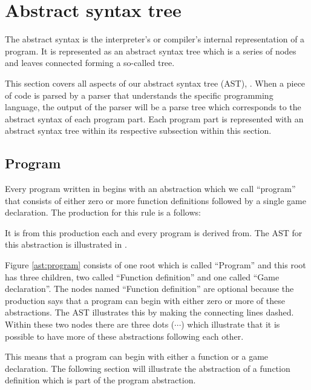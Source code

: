 \section{Abstract syntax tree}

The abstract syntax is the interpreter's or compiler's internal representation of a program. It is represented as an abstract syntax tree which is a series of nodes and leaves connected forming a so-called tree.

This section covers all aspects of our abstract syntax tree (AST), . When a piece of code is parsed by a parser that understands the specific programming language, the output of the parser will be a parse tree which corresponds to the abstract syntax of each program part. Each program part is represented with an abstract syntax tree within its respective subsection within this section.

\subsection{Program}
Every program written in \productname{} begins with an abstraction which we call ``program'' that consists of either zero or more function definitions followed by a single game declaration. The production for this rule is a follows:

\begin{ebnf}
\end{ebnf}

It is from this production each and every program is derived from. The AST for this abstraction is illustrated in .



Figure \ref{ast:program} consists of one root which is called ``Program'' and this root has three children, two called ``Function definition'' and one called ``Game declaration''. The nodes named ``Function definition'' are optional because the production says that a program can begin with either zero or more of these abstractions. The AST illustrates this by making the connecting lines dashed. Within these two nodes there are three dots ($\cdots$) which illustrate that it is possible to have more of these abstractions following each other.

This means that a program can begin with either a function or a game declaration. The following section will illustrate the abstraction of a function definition which is part of the program abstraction.


